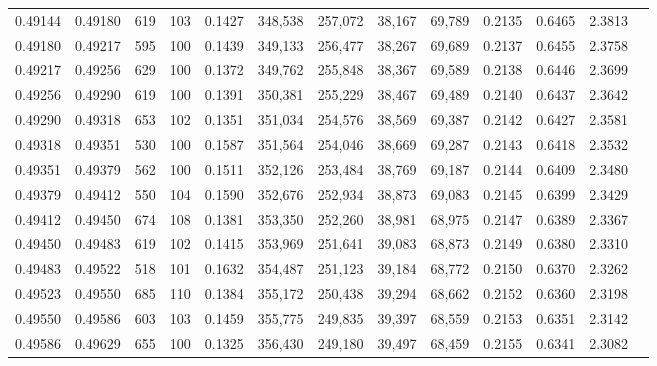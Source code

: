 \begin{tabular}{rrrrrrrrrrrrr}
0.49144 & 0.49180 &   619 & 103 &                                     0.1427 & 348,538 & 257,072 &  38,167 &  69,789 & 0.2135 & 0.6465 & 2.3813 \\
0.49180 & 0.49217 &   595 & 100 &                                     0.1439 & 349,133 & 256,477 &  38,267 &  69,689 & 0.2137 & 0.6455 & 2.3758 \\
0.49217 & 0.49256 &   629 & 100 &                                     0.1372 & 349,762 & 255,848 &  38,367 &  69,589 & 0.2138 & 0.6446 & 2.3699 \\
0.49256 & 0.49290 &   619 & 100 &                                     0.1391 & 350,381 & 255,229 &  38,467 &  69,489 & 0.2140 & 0.6437 & 2.3642 \\
0.49290 & 0.49318 &   653 & 102 &                                     0.1351 & 351,034 & 254,576 &  38,569 &  69,387 & 0.2142 & 0.6427 & 2.3581 \\
0.49318 & 0.49351 &   530 & 100 &                                     0.1587 & 351,564 & 254,046 &  38,669 &  69,287 & 0.2143 & 0.6418 & 2.3532 \\
0.49351 & 0.49379 &   562 & 100 &                                     0.1511 & 352,126 & 253,484 &  38,769 &  69,187 & 0.2144 & 0.6409 & 2.3480 \\
0.49379 & 0.49412 &   550 & 104 &                                     0.1590 & 352,676 & 252,934 &  38,873 &  69,083 & 0.2145 & 0.6399 & 2.3429 \\
0.49412 & 0.49450 &   674 & 108 &                                     0.1381 & 353,350 & 252,260 &  38,981 &  68,975 & 0.2147 & 0.6389 & 2.3367 \\
0.49450 & 0.49483 &   619 & 102 &                                     0.1415 & 353,969 & 251,641 &  39,083 &  68,873 & 0.2149 & 0.6380 & 2.3310 \\
0.49483 & 0.49522 &   518 & 101 &                                     0.1632 & 354,487 & 251,123 &  39,184 &  68,772 & 0.2150 & 0.6370 & 2.3262 \\
0.49523 & 0.49550 &   685 & 110 &                                     0.1384 & 355,172 & 250,438 &  39,294 &  68,662 & 0.2152 & 0.6360 & 2.3198 \\
0.49550 & 0.49586 &   603 & 103 &                                     0.1459 & 355,775 & 249,835 &  39,397 &  68,559 & 0.2153 & 0.6351 & 2.3142 \\
0.49586 & 0.49629 &   655 & 100 &                                     0.1325 & 356,430 & 249,180 &  39,497 &  68,459 & 0.2155 & 0.6341 & 2.3082 \\

\end{tabular}
